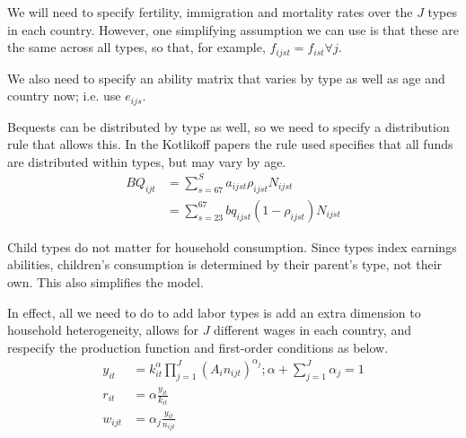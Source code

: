 \documentclass[letterpaper,12pt]{article}
\theoremstyle{definition}
\numberwithin{equation}{section}
\begin{document}
\begin{spacing}{1.5}
	We will need to specify fertility, immigration and mortality rates over the $J$ types in each country.  However, one simplifying assumption we can use is that these are the same across all types, so that, for example, $f_{ijst} = f_{ist} \forall j$.

	We also need to specify an ability matrix that varies by type as well as age and country now; i.e. use $e_{ijs}$.

	Bequests can be distributed by type as well, so we need to specify a distribution rule that allows this.  In the Kotlikoff papers the rule used specifies that all funds are distributed within types, but may vary by age.
	\begin{align}
		BQ_{ijt} & = \sum_{s=67}^S a_{ijst} \rho_{ijst} N_{ijst} \\
		& = \sum_{s=23}^{67} bq_{ijst} (1-\rho_{ijst}) N_{ijst}
	\end{align}

	Child types do not matter for household consumption.  Since types index earnings abilities, children's consumption is determined by their parent's type, not their own.  This also simplifies the model.

	In effect, all we need to do to add labor types is add an extra dimension to household heterogeneity, allows for $J$ different wages in each country, and respecify the production function and first-order conditions as below.
	\begin{align}
		y_{it} & = k_{it}^\alpha \prod_{j=1}^J \left( A_{i} n_{ijt} \right)^{\alpha_j}; \alpha + \sum_{j=1}^J \alpha_j = 1 \\
		r_{it} & = \alpha \frac{y_{it}}{k_{it}} \\
		w_{ijt} & = \alpha_j \frac{y_{it}}{n_{ijt}}
	\end{align}


\end{spacing}
\end{document}
